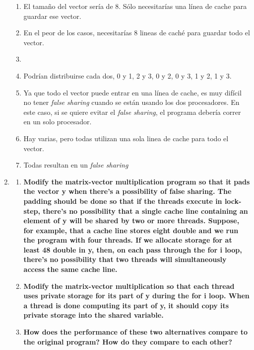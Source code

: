 \documentclass[a4paper,12pt]{article}
\begin{document}
\begin{enumerate}
\begin{enumerate}
 \item El tamaño del vector sería de 8. Sólo necesitarías una línea de cache para guardar ese vector.
 \item En el peor de los casos, necesitarías 8 lineas de caché para guardar todo el vector.
 \item 
 \item Podrían distribuirse cada dos, 0 y 1, 2 y 3, 0 y 2, 0 y 3, 1 y 2, 1 y 3.
 \item Ya que todo el vector puede entrar en una línea de cache, es muy difícil no tener \textit{false sharing} cuando
 se están usando los dos procesadores. En este caso, si se quiere evitar el \textit{false sharing}, el programa debería correr
 en un solo procesador.
 \item Hay varias, pero todas utilizan una sola linea de cache para todo el vector.
 \item Todas resultan en un \textit{false sharing}
\end{enumerate}


\item{
\begin{enumerate}
 \item \textbf{Modify the matrix-vector multiplication program so that it pads the vector y when there’s a possibility of
 false sharing. The padding should be done so that if the threads execute in lock-step, there’s no possibility that
 a single cache line containing an element of y will be shared by two or more threads. Suppose, for example, that a cache
 line stores eight double and we run the program with four threads. If we allocate storage for at least 48 double in y, then,
 on each pass through the for i loop, there’s no possibility that two threads will simultaneously access the same cache line.}
 \item \textbf{Modify the matrix-vector multiplication so that each thread uses private storage for its part of y during
 the for i loop. When a thread is done computing its part of y, it should copy its private storage into the shared variable.}
 \item \textbf{How does the performance of these two alternatives compare to the original program? How do they compare to each other?}
\end{enumerate}
}


\end{enumerate}
\end{document}
